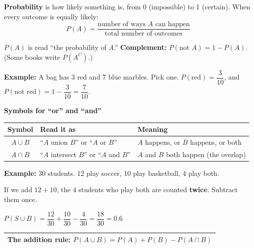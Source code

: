 \documentclass[11pt]{article}
\begin{document}

\textbf{Probability} is how likely something is, from 0 (impossible) to 1 (certain).
When every outcome is equally likely:
\[ P(A) = \frac{\text{number of ways } A \text{ can happen}}{\text{total number of outcomes}} \]

\vspace{-0.3em}%
$P(A)$ is read ``the probability of $A$.'' \qquad \textbf{Complement:} $P(\text{not } A) = 1 - P(A)$. \; (Some books write $P(A^C)$.)

\vspace{0.3em}
\textbf{Example:} A bag has 3 red and 7 blue marbles. Pick one. \; $P(\text{red}) = \dfrac{3}{10}$, and $P(\text{not red}) = 1 - \dfrac{3}{10} = \dfrac{7}{10}$.

\vspace{0.8em}
\textbf{Symbols for ``or'' and ``and''}

\vspace{0.2em}
\renewcommand{\arraystretch}{1.35}
\begin{tabular}{|c|l|l|}\hline
\textbf{Symbol} & \textbf{Read it as} & \textbf{Meaning}\\ \hline
$A \cup B$ & ``$A$ union $B$'' or ``$A$ or $B$'' & $A$ happens, or $B$ happens, or both\\ \hline
$A \cap B$ & ``$A$ intersect $B$'' or ``$A$ and $B$'' & $A$ and $B$ both happen (the overlap)\\ \hline
\end{tabular}

\vspace{0.8em}
\textbf{Example:} 30 students. 12 play soccer, 10 play basketball, 4 play both.

\begin{minipage}[c]{0.42\linewidth}\centering
{}
\end{minipage}\hfill
\begin{minipage}[c]{0.56\linewidth}
If we add $12 + 10$, the 4 students who play both are counted \textbf{twice}. Subtract them once.

\vspace{0.4em}
$P(S \cup B) = \dfrac{12}{30} + \dfrac{10}{30} - \dfrac{4}{30} = \dfrac{18}{30} = 0.6$
\end{minipage}

\vspace{0.6em}
\begin{tabular}{|>{\raggedright\arraybackslash}p{6.7in}|}\hline
\textbf{The addition rule:} \qquad $P(A \cup B) = P(A) + P(B) - P(A \cap B)$\\ \hline
\end{tabular}
\end{document}
